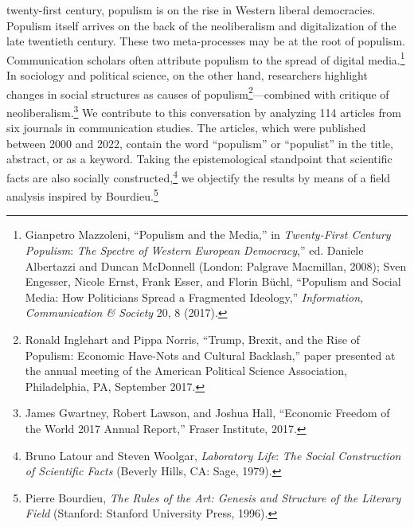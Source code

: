 \documentclass{tufte-handout}
\begin{document}

 twenty-first century, populism is on the rise in Western
liberal democracies. Populism itself arrives on the back of the
neoliberalism and digitalization of the late twentieth century. These
two meta-processes may be at the root of populism. Communication
scholars often attribute populism to the spread of digital
media.\footnote{Gianpetro Mazzoleni, ``Populism and the Media,'' in
  \emph{Twenty-First Century Populism}: \emph{The Spectre of Western
  European Democracy},'' ed. Daniele Albertazzi and Duncan McDonnell
  (London: Palgrave Macmillan, 2008); Sven Engesser, Nicole Ernst, Frank
  Esser, and Florin Büchl, ``Populism and Social Media: How Politicians
  Spread a Fragmented Ideology,'' \emph{Information, Communication \&
  Society} 20, 8 (2017).} In sociology and political science, on the
other hand, researchers highlight changes in social structures as causes
of populism\footnote{Ronald Inglehart and Pippa Norris, ``Trump, Brexit,
  and the Rise of Populism: Economic Have-Nots and Cultural Backlash,''
  paper presented at the annual meeting of the American Political
  Science Association, Philadelphia, PA, September 2017.}---combined
with critique of neoliberalism.\footnote{James Gwartney, Robert Lawson,
  and Joshua Hall, ``Economic Freedom of the World 2017 Annual Report,''
  Fraser Institute, 2017.} We contribute to this conversation by
analyzing 114 articles from six journals in communication studies. The
articles, which were published between 2000 and 2022, contain the word
``populism'' or ``populist'' in the title, abstract, or as a keyword.
Taking the epistemological standpoint that scientific facts are also
socially constructed,\footnote{Bruno Latour and Steven Woolgar,
  \emph{Laboratory Life}: \emph{The Social Construction of Scientific
  Facts} (Beverly Hills, CA: Sage, 1979).} we objectify the results by
means of a field analysis inspired by Bourdieu.\footnote{Pierre
  Bourdieu, \emph{The Rules of the Art: Genesis and Structure of the
  Literary Field} (Stanford: Stanford University Press, 1996).}
\end{document}
